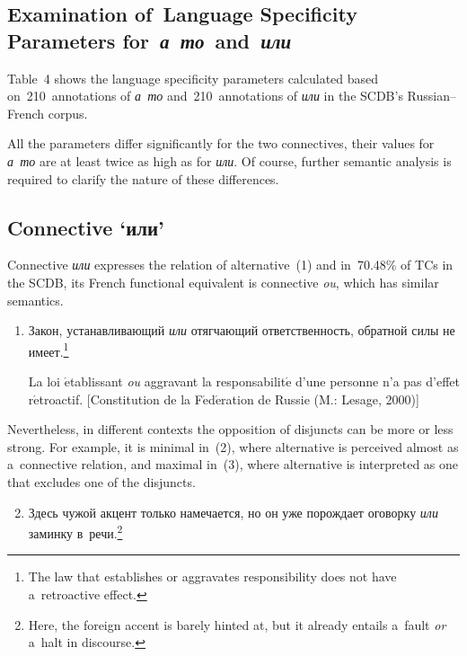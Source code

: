 \begin{multicols}{2}
  
  \section{Examination of~Language Specificity Parameters 
  for~\textit{а~то}~and~\textit{или}}
  
  
  \noindent
  Table~4 shows the language specificity parameters calculated based 
on~210~annotations of \textit{а~то} and~210~annotations of \textit{или} in the 
SCDB's Russian--French corpus.
  
 


  All the parameters differ significantly for the two connectives, their values for 
\textit{а~то} are at least twice as high as for \textit{или}. Of course, further semantic 
analysis is required to clarify the nature of these differences.

  
  \subsection{Connective `или'}
  
  \noindent 
  Connective \textit{или} expresses the relation of alternative~(1) and in~70.48\% of 
TCs in the SCDB, its French functional equivalent is connective \textit{ou}, which 
has similar semantics.
  \begin{enumerate}[(1)]
  \item Закон, устанавливающий \textit{или} отягчающий ответственность, обратной силы не 
имеет.\footnote{The law that establishes or aggravates responsibility does not have a~retroactive effect.}
    
  La loi $\acute{\mbox{e}}$tablissant \textit{ou} aggravant la responsabilit$\acute{\mbox{e}}$ 
d'une personne n'a pas d'effet r$\acute{\mbox{e}}$troactif. [Constitution de la 
F$\acute{\mbox{e}}$d$\acute{\mbox{e}}$ration de Russie (M.: Lesage, 2000)]
  \end{enumerate}
  
  Nevertheless, in different contexts the opposition of disjuncts can be more or less 
strong. For example, it is minimal in~(2), where alternative is perceived almost as 
a~connective relation, and maximal in~(3), where alternative is interpreted as one 
that excludes one of the disjuncts.
  \begin{enumerate}[(1)]
  \setcounter{enumi}{1}
\item Здесь чужой акцент только намечается, но он уже порождает оговорку 
\textit{или} заминку в~речи.\footnote{Here, the foreign accent is 
barely hinted at, but it 
already entails a~fault \textit{or} a~halt in discourse.}   
 

\end{enumerate}
\end{multicols}
